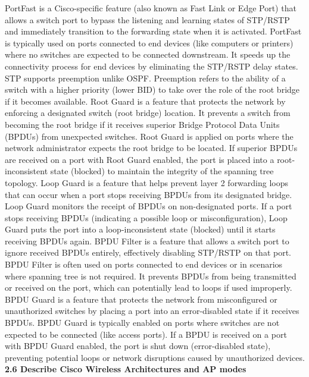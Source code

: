 \documentclass{article}
\begin{document}
	PortFast is a Cisco-specific feature (also known as Fast Link or Edge Port) that allows a switch port to bypass the listening and learning states of STP/RSTP and immediately transition to the forwarding state when it is activated. PortFast is typically used on ports connected to end devices (like computers or printers) where no switches are expected to be connected downstream. It speeds up the connectivity process for end devices by eliminating the STP/RSTP delay states. STP supports preemption unlike OSPF. Preemption refers to the ability of a switch with a higher priority (lower BID) to take over the role of the root bridge if it becomes available. Root Guard is a feature that protects the network by enforcing a designated switch (root bridge) location. It prevents a switch from becoming the root bridge if it receives superior Bridge Protocol Data Units (BPDUs) from unexpected switches. Root Guard is applied on ports where the network administrator expects the root bridge to be located. If superior BPDUs are received on a port with Root Guard enabled, the port is placed into a root-inconsistent state (blocked) to maintain the integrity of the spanning tree topology. Loop Guard is a feature that helps prevent layer 2 forwarding loops that can occur when a port stops receiving BPDUs from its designated bridge. Loop Guard monitors the receipt of BPDUs on non-designated ports. If a port stops receiving BPDUs (indicating a possible loop or misconfiguration), Loop Guard puts the port into a loop-inconsistent state (blocked) until it starts receiving BPDUs again. BPDU Filter is a feature that allows a switch port to ignore received BPDUs entirely, effectively disabling STP/RSTP on that port. BPDU Filter is often used on ports connected to end devices or in scenarios where spanning tree is not required. It prevents BPDUs from being transmitted or received on the port, which can potentially lead to loops if used improperly. BPDU Guard is a feature that protects the network from misconfigured or unauthorized switches by placing a port into an error-disabled state if it receives BPDUs. BPDU Guard is typically enabled on ports where switches are not expected to be connected (like access ports). If a BPDU is received on a port with BPDU Guard enabled, the port is shut down (error-disabled state), preventing potential loops or network disruptions caused by unauthorized devices.\\
  
\noindent\textbf{2.6 Describe Cisco Wireless Architectures and AP modes}\\
  
\end{document}
